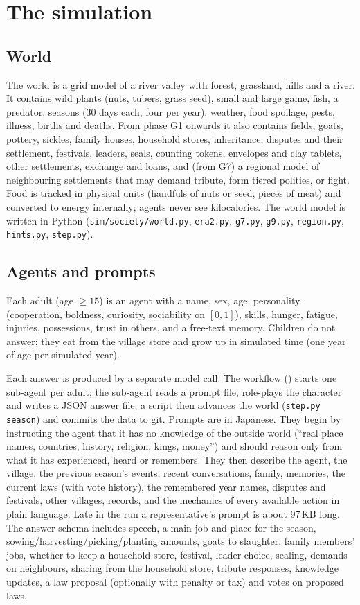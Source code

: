 \documentclass[11pt]{article}
\begin{document}
\section{The simulation}
\label{sec:sim}

\subsection{World}
The world is a grid model of a river valley with forest, grassland, hills and a river. It contains wild plants (nuts, tubers, grass seed), small and large game, fish, a predator, seasons (30 days each, four per year), weather, food spoilage, pests, illness, births and deaths. From phase G1 onwards it also contains fields, goats, pottery, sickles, family houses, household stores, inheritance, disputes and their settlement, festivals, leaders, seals, counting tokens, envelopes and clay tablets, other settlements, exchange and loans, and (from G7) a regional model of neighbouring settlements that may demand tribute, form tiered polities, or fight. Food is tracked in physical units (handfuls of nuts or seed, pieces of meat) and converted to energy internally; agents never see kilocalories. The world model is written in Python (\texttt{sim/society/world.py}, \texttt{era2.py}, \texttt{g7.py}, \texttt{g9.py}, \texttt{region.py}, \texttt{hints.py}, \texttt{step.py}).

\subsection{Agents and prompts}
Each adult (age $\ge 15$) is an agent with a name, sex, age, personality (cooperation, boldness, curiosity, sociability on $[0,1]$), skills, hunger, fatigue, injuries, possessions, trust in others, and a free-text memory. Children do not answer; they eat from the village store and grow up in simulated time (one year of age per simulated year).

Each answer is produced by a separate model call. The workflow () starts one sub-agent per adult; the sub-agent reads a prompt file, role-plays the character and writes a JSON answer file; a script then advances the world (\texttt{step.py season}) and commits the data to git. Prompts are in Japanese. They begin by instructing the agent that it has no knowledge of the outside world (``real place names, countries, history, religion, kings, money'') and should reason only from what it has experienced, heard or remembers. They then describe the agent, the village, the previous season's events, recent conversations, family, memories, the current laws (with vote history), the remembered year names, disputes and festivals, other villages, records, and the mechanics of every available action in plain language. Late in the run a representative's prompt is about 97\,KB long. The answer schema includes speech, a main job and place for the season, sowing/harvesting/picking/planting amounts, goats to slaughter, family members' jobs, whether to keep a household store, festival, leader choice, sealing, demands on neighbours, sharing from the household store, tribute responses, knowledge updates, a law proposal (optionally with penalty or tax) and votes on proposed laws.
\end{document}
